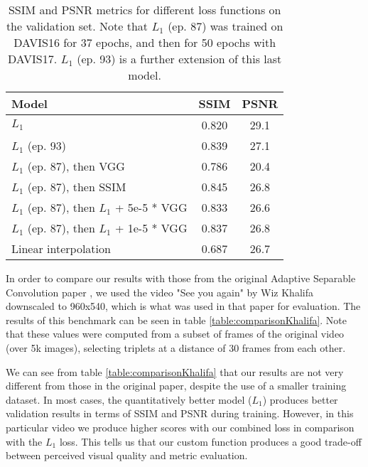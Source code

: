 \documentclass[10pt,twocolumn,letterpaper]{article}
\begin{document}
\begin{table}[h]
\centering
\begin{tabular}{|l|c|c|}
\hline
	Model & SSIM & PSNR \\
	\hline
$L_1$                                       & 0.820 & 29.1 \\
$L_1$ (ep. 93)                              & 0.839 & 27.1 \\
$L_1$ (ep. 87), then VGG                    & 0.786 & 20.4  \\
$L_1$ (ep. 87), then SSIM                   & 0.845 & 26.8  \\
$L_1$ (ep. 87), then $L_1$ + 5e-5 * VGG     & 0.833 & 26.6  \\
$L_1$ (ep. 87), then $L_1$ + 1e-5 * VGG     & 0.837 & 26.8  \\
Linear interpolation                        & 0.687 & 26.7  \\
	\hline
\end{tabular}
\vspace{1em}
\caption{SSIM and PSNR metrics for different loss functions on the validation set. Note that $L_1$ (ep. 87) was trained on DAVIS16 for 37 epochs, and then for 50 epochs with DAVIS17. $L_1$ (ep. 93) is a further extension of this last model.}
\label{table:comparisonAllModels}
\end{table}

In order to compare our results with those from the original Adaptive Separable Convolution paper \cite{AdapConv}, we used the video "See you again" by Wiz Khalifa downscaled to 960x540, which is what was used in that paper for evaluation. The results of this benchmark can be seen in table \ref{table:comparisonKhalifa}. Note that these values were computed from a subset of frames of the original video (over 5k images), selecting triplets at a distance of 30 frames from each other.

We can see from table \ref{table:comparisonKhalifa} that our results are not very different from those in the original paper, despite the use of a smaller training dataset. In most cases, the quantitatively better model ($L_1$) produces better validation results in terms of SSIM and PSNR during training. However, in this particular video we produce higher scores with our combined loss in comparison with the $L_1$ loss. This tells us that our custom function produces a good trade-off between perceived visual quality and metric evaluation.
\end{document}
